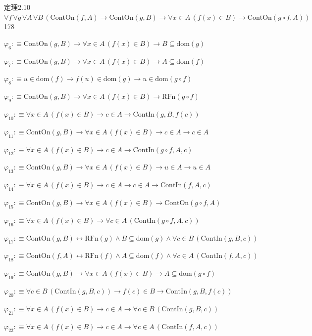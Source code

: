 \begin{fullproof}{定理2.10}{$\forall f\,\forall g\,\forall A\,\forall B\,(\mathrm{ContOn}(f,A) \to \mathrm{ContOn}(g,B) \to \forall x \in A\,(f(x) \in B) \to \mathrm{ContOn}(g \circ f,A))$}{178}
\begin{abbrevlist}
\item $\varphi_{6} :\equiv \mathrm{ContOn}(g,B) \to \forall x \in A\,(f(x) \in B) \to B \subseteq \mathrm{dom}(g)$
\item $\varphi_{7} :\equiv \mathrm{ContOn}(g,B) \to \forall x \in A\,(f(x) \in B) \to A \subseteq \mathrm{dom}(f)$
\item $\varphi_{8} :\equiv u \in \mathrm{dom}(f) \to f(u) \in \mathrm{dom}(g) \to u \in \mathrm{dom}(g \circ f)$
\item $\varphi_{9} :\equiv \mathrm{ContOn}(g,B) \to \forall x \in A\,(f(x) \in B) \to \mathrm{RFn}(g \circ f)$
\item $\varphi_{10} :\equiv \forall x \in A\,(f(x) \in B) \to c \in A \to \mathrm{ContIn}(g,B,f(c))$
\item $\varphi_{11} :\equiv \mathrm{ContOn}(g,B) \to \forall x \in A\,(f(x) \in B) \to c \in A \to c \in A$
\item $\varphi_{12} :\equiv \forall x \in A\,(f(x) \in B) \to c \in A \to \mathrm{ContIn}(g \circ f,A,c)$
\item $\varphi_{13} :\equiv \mathrm{ContOn}(g,B) \to \forall x \in A\,(f(x) \in B) \to u \in A \to u \in A$
\item $\varphi_{14} :\equiv \forall x \in A\,(f(x) \in B) \to c \in A \to c \in A \to \mathrm{ContIn}(f,A,c)$
\item $\varphi_{15} :\equiv \mathrm{ContOn}(g,B) \to \forall x \in A\,(f(x) \in B) \to \mathrm{ContOn}(g \circ f,A)$
\item $\varphi_{16} :\equiv \forall x \in A\,(f(x) \in B) \to \forall c \in A\,(\mathrm{ContIn}(g \circ f,A,c))$
\item $\varphi_{17} :\equiv \mathrm{ContOn}(g,B) \leftrightarrow \mathrm{RFn}(g) \land B \subseteq \mathrm{dom}(g) \land \forall c \in B\,(\mathrm{ContIn}(g,B,c))$
\item $\varphi_{18} :\equiv \mathrm{ContOn}(f,A) \leftrightarrow \mathrm{RFn}(f) \land A \subseteq \mathrm{dom}(f) \land \forall c \in A\,(\mathrm{ContIn}(f,A,c))$
\item $\varphi_{19} :\equiv \mathrm{ContOn}(g,B) \to \forall x \in A\,(f(x) \in B) \to A \subseteq \mathrm{dom}(g \circ f)$
\item $\varphi_{20} :\equiv \forall c \in B\,(\mathrm{ContIn}(g,B,c)) \to f(c) \in B \to \mathrm{ContIn}(g,B,f(c))$
\item $\varphi_{21} :\equiv \forall x \in A\,(f(x) \in B) \to c \in A \to \forall c \in B\,(\mathrm{ContIn}(g,B,c))$
\item $\varphi_{22} :\equiv \forall x \in A\,(f(x) \in B) \to c \in A \to \forall c \in A\,(\mathrm{ContIn}(f,A,c))$

\end{abbrevlist}
\end{fullproof}
